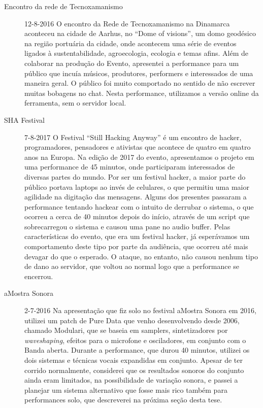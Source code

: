\begin{description}
\item[Encontro da rede de Tecnoxamanismo] 12-8-2016
O encontro da Rede de Tecnoxamanismo na Dinamarca aconteceu na cidade de Aarhus, no ``Dome of visions'', um domo geodésico na região portuária da cidade, onde acontecem uma série de eventos ligados à sustentabilidade, agroecologia, ecologia e temas afins. Além de colaborar na produção do Evento, apresentei a performance para um público que incuía músicos, produtores, performers e interessados de uma maneira geral. O público foi muito comportado no sentido de não escrever muitas bobagens no chat. Nesta performance, utilizamos a versão online da ferramenta, sem o servidor local.


\item[SHA Festival] 7-8-2017
O Festival ``Still Hacking Anyway'' é um encontro de hacker, programadores, pensadores e ativistas que acontece de quatro em quatro anos na Europa. Na edição de 2017 do evento, apresentamos o projeto em uma performance de 45 minutos, onde participaram interessados de diversas partes do mundo. Por ser um festival hacker, a maior parte do público portava laptops ao invés de celulares, o que permitiu uma maior agilidade na digitação das mensagens. Alguns dos presentes passaram a performance tentando hackear com o intuito de derrubar o sistema, o que ocorreu a cerca de 40 minutos depois do início, através de um script que sobrecarregou o sistema e causou uma pane no audio buffer. Pelas características do evento, que era um festival hacker,  já esperávamos um comportamento deste tipo por parte da audiência, que ocorreu até mais devagar do que o esperado. O ataque, no entanto, não causou nenhum tipo de dano ao servidor, que voltou ao normal logo que a performance se encerrou.

\item[aMostra Sonora] 2-7-2016
Na apresentação que fiz solo no festival aMostra Sonora em 2016, utilizei um patch de Pure Data que venho desenvolvendo desde 2006, chamado Modulari, que se baseia em samplers, sintetizadores por \emph{waveshaping}, efeitos para o microfone e osciladores, em conjunto com o Banda aberta. Durante a performance, que durou 40 minutos, utilizei os dois sistemas e técnicas vocais expandidas em conjunto. Apesar de ter corrido normalmente, considerei que os resultados sonoros do conjunto ainda eram limitados, na possibilidade de variação sonora, e passei a planejar um sistema alternativo que fosse mais rico também para performances solo, que descreverei na próxima seção desta tese.





\end{description}
